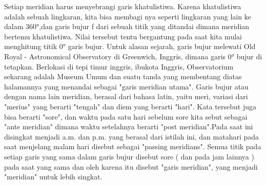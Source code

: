 	Setiap meridian harus menyebrangi garis khatulistiwa. Karena khatulistiwa adalah sebuah lingkaran, kita bisa membagi nya seperti lingkaran
	yang lain ke dalam 360°,dan garis bujur f dari sebuah titik yang ditandai dimana meridian bertemu khatulistiwa.
	Nilai tersebut tentu bergantung pada saat kita mulai menghitung titik 0° garis bujur. Untuk alasan sejarah, garis bujur melewati Old Royal -
	Astronomical Observatory di Greenwich, Inggris, dimana garis 0° bujur di tetapkan. Berlokasi di tepi timur inggris, ibukota Inggris, Observatorium
	sekarang adalah Museum Umum dan suatu tanda yang membentang diatas halamannya yang menandai sebagai "garis meridian utama".
	Garis bujur atau dengan nama lain meridian, berasal dari bahasa latin, yaitu meri, variasi dari "merius" yang berarti "tengah" dan diem yang berarti 
	"hari". Kata tersebut juga bisa berarti "sore", dan waktu pada satu hari sebelum sore kita sebut sebagai "ante meridian" dimana waktu setelahnya berarti 
	"post meridian".Pada saat ini disingkat menjadi a.m. dan p.m. yang berasal dari istilah ini, dan matahari pada saat menjelang malam hari disebut sebagai
	"passing meridians". Semua titik pada setiap garis yang sama dalam garis bujur disebut sore ( dan pada jam lainnya ) pada saat yang sama dan oleh karena 
	itu disebut "garis meridian", yang menjadi "meridian" untuk lebih singkat.
